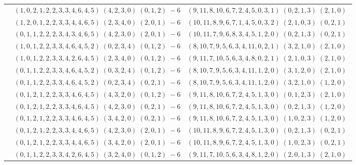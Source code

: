 \documentclass[11pt]{article}
\begin{document}
\begin{longtable}[l]{|c|c|c|}
 \cline{2-3} 
 & $(1 ,0 ,2 ,1 ,2 ,2 ,3 ,3 ,4 ,6 ,4 ,5) \;(4 ,2 ,3 ,0) \;(0 ,1 ,2) \;-6$ & $(9 ,11 ,8 ,10 ,6 ,7 ,2 ,4 ,5 ,0 ,3 ,1) \;(0 ,2 ,1 ,3) \;(2 ,1 ,0) \;$\\ 
 \cline{2-3} 
 & $(1 ,2 ,0 ,1 ,2 ,2 ,3 ,3 ,4 ,4 ,6 ,5) \;(2 ,3 ,4 ,0) \;(2 ,0 ,1) \;-6$ & $(10 ,11 ,8 ,9 ,6 ,7 ,1 ,4 ,5 ,0 ,3 ,2) \;(2 ,1 ,0 ,3) \;(0 ,2 ,1) \;$\\ 
 \cline{2-3} 
 & $(0 ,1 ,1 ,2 ,2 ,2 ,3 ,4 ,3 ,4 ,6 ,5) \;(4 ,2 ,3 ,0) \;(2 ,0 ,1) \;-6$ & $(10 ,11 ,7 ,9 ,6 ,8 ,3 ,4 ,5 ,1 ,2 ,0) \;(0 ,2 ,1 ,3) \;(0 ,2 ,1) \;$\\ 
 \cline{2-3} 
 & $(1 ,0 ,1 ,2 ,2 ,3 ,3 ,4 ,6 ,4 ,5 ,2) \;(0 ,2 ,3 ,4) \;(0 ,1 ,2) \;-6$ & $(8 ,10 ,7 ,9 ,5 ,6 ,3 ,4 ,11 ,0 ,2 ,1) \;(3 ,2 ,1 ,0) \;(2 ,1 ,0) \;$\\ 
 \cline{2-3} 
 & $(1 ,0 ,1 ,2 ,2 ,3 ,3 ,4 ,2 ,6 ,4 ,5) \;(2 ,3 ,4 ,0) \;(0 ,1 ,2) \;-6$ & $(9 ,11 ,7 ,10 ,5 ,6 ,3 ,4 ,8 ,0 ,2 ,1) \;(2 ,1 ,0 ,3) \;(2 ,1 ,0) \;$\\ 
 \cline{2-3} 
 & $(0 ,1 ,1 ,2 ,2 ,3 ,3 ,4 ,6 ,4 ,5 ,2) \;(0 ,3 ,2 ,4) \;(0 ,1 ,2) \;-6$ & $(8 ,10 ,7 ,9 ,5 ,6 ,3 ,4 ,11 ,1 ,2 ,0) \;(3 ,1 ,2 ,0) \;(2 ,1 ,0) \;$\\ 
 \cline{2-3} 
 & $(0 ,1 ,1 ,2 ,2 ,3 ,3 ,4 ,6 ,4 ,5 ,2) \;(0 ,2 ,3 ,4) \;(0 ,2 ,1) \;-6$ & $(8 ,10 ,7 ,9 ,5 ,6 ,3 ,4 ,11 ,1 ,2 ,0) \;(3 ,2 ,1 ,0) \;(1 ,2 ,0) \;$\\ 
 \cline{2-3} 
 & $(0 ,1 ,2 ,1 ,2 ,2 ,3 ,3 ,4 ,6 ,4 ,5) \;(4 ,3 ,2 ,0) \;(0 ,1 ,2) \;-6$ & $(9 ,11 ,8 ,10 ,6 ,7 ,2 ,4 ,5 ,1 ,3 ,0) \;(0 ,1 ,2 ,3) \;(2 ,1 ,0) \;$\\ 
 \cline{2-3} 
 & $(0 ,1 ,2 ,1 ,2 ,2 ,3 ,3 ,4 ,6 ,4 ,5) \;(4 ,2 ,3 ,0) \;(0 ,2 ,1) \;-6$ & $(9 ,11 ,8 ,10 ,6 ,7 ,2 ,4 ,5 ,1 ,3 ,0) \;(0 ,2 ,1 ,3) \;(1 ,2 ,0) \;$\\ 
 \cline{2-3} 
 & $(0 ,1 ,2 ,1 ,2 ,2 ,3 ,3 ,4 ,6 ,4 ,5) \;(3 ,4 ,2 ,0) \;(0 ,2 ,1) \;-6$ & $(9 ,11 ,8 ,10 ,6 ,7 ,2 ,4 ,5 ,1 ,3 ,0) \;(1 ,0 ,2 ,3) \;(1 ,2 ,0) \;$\\ 
 \cline{2-3} 
 & $(0 ,1 ,2 ,1 ,2 ,2 ,3 ,3 ,4 ,4 ,6 ,5) \;(4 ,2 ,3 ,0) \;(2 ,0 ,1) \;-6$ & $(10 ,11 ,8 ,9 ,6 ,7 ,2 ,4 ,5 ,1 ,3 ,0) \;(0 ,2 ,1 ,3) \;(0 ,2 ,1) \;$\\ 
 \cline{2-3} 
 & $(0 ,1 ,2 ,1 ,2 ,2 ,3 ,3 ,4 ,4 ,6 ,5) \;(3 ,4 ,2 ,0) \;(2 ,0 ,1) \;-6$ & $(10 ,11 ,8 ,9 ,6 ,7 ,2 ,4 ,5 ,1 ,3 ,0) \;(1 ,0 ,2 ,3) \;(0 ,2 ,1) \;$\\ 
 \cline{2-3} 
 & $(0 ,1 ,1 ,2 ,2 ,3 ,3 ,4 ,2 ,6 ,4 ,5) \;(3 ,2 ,4 ,0) \;(0 ,1 ,2) \;-6$ & $(9 ,11 ,7 ,10 ,5 ,6 ,3 ,4 ,8 ,1 ,2 ,0) \;(2 ,0 ,1 ,3) \;(2 ,1 ,0) \;$\\ 

\end{longtable}
\end{document}
